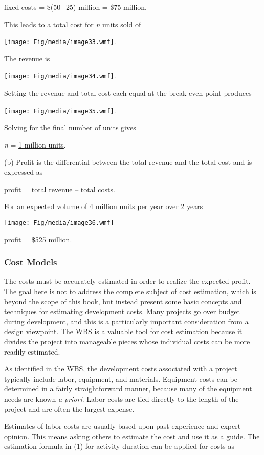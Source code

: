 fixed costs = \$(50+25) million = \$75 million.

This leads to a total cost for \emph{n} units sold of

\texttt{[image: Fig/media/image33.wmf]}.

The revenue is

\texttt{[image: Fig/media/image34.wmf]}.

Setting the revenue and total cost each equal at the break-even point
produces

\texttt{[image: Fig/media/image35.wmf]}.

Solving for the final number of units gives

\emph{n} = \ul{1 million units}.

(b) Profit is the differential between the total revenue and the total
cost and is expressed as

profit = total revenue -- total costs.

For an expected volume of 4 million units per year over 2 years

\texttt{[image: Fig/media/image36.wmf]}

profit = \ul{\$525 million}.

\subsubsection{Cost Models}\label{cost-models}

The costs must be accurately estimated in order to realize the expected
profit. The goal here is not to address the complete subject of cost
estimation, which is beyond the scope of this book, but instead present
some basic concepts and techniques for estimating development costs.
Many projects go over budget during development, and this is a
particularly important consideration from a design viewpoint. The WBS is
a valuable tool for cost estimation because it divides the project into
manageable pieces whose individual costs can be more readily estimated.

As identified in the WBS, the development costs associated with a
project typically include labor, equipment, and materials. Equipment
costs can be determined in a fairly straightforward manner, because many
of the equipment needs are known \emph{a priori}. Labor costs are tied
directly to the length of the project and are often the largest expense.

Estimates of labor costs are usually based upon past experience and
expert opinion. This means asking others to estimate the cost and use it
as a guide. The estimation formula in (1) for activity duration can be
applied for costs as

